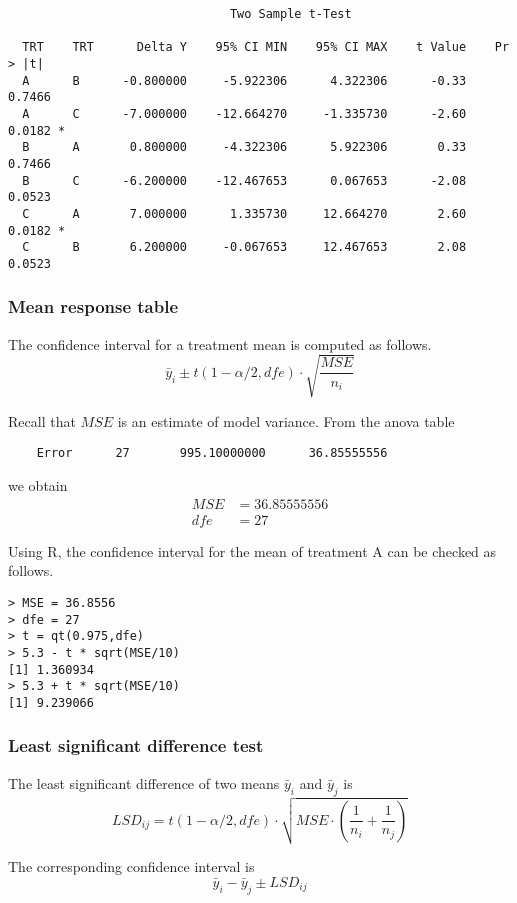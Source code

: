 \documentclass[12pt]{article}
\begin{document}
{\begin{verbatim}
                               Two Sample t-Test

  TRT    TRT      Delta Y    95% CI MIN    95% CI MAX    t Value    Pr > |t|  
  A      B      -0.800000     -5.922306      4.322306      -0.33      0.7466  
  A      C      -7.000000    -12.664270     -1.335730      -2.60      0.0182 *
  B      A       0.800000     -4.322306      5.922306       0.33      0.7466  
  B      C      -6.200000    -12.467653      0.067653      -2.08      0.0523  
  C      A       7.000000      1.335730     12.664270       2.60      0.0182 *
  C      B       6.200000     -0.067653     12.467653       2.08      0.0523  
\end{verbatim}}

\subsubsection*{Mean response table}

The confidence interval for a treatment mean is computed as follows.
\[
\bar y_i\pm t(1-\alpha/2,dfe)\cdot\sqrt{\frac{MSE}{n_i}}
\]

Recall that $MSE$ is an estimate of model variance.
From the anova table

{\footnotesize\begin{verbatim}
    Error      27       995.10000000      36.85555556
\end{verbatim}}

we obtain
\begin{align*}
MSE&=36.85555556\\
dfe&=27
\end{align*}

Using R, the confidence interval for the mean of treatment A can be
checked as follows.

{\footnotesize\begin{verbatim}
> MSE = 36.8556
> dfe = 27
> t = qt(0.975,dfe)
> 5.3 - t * sqrt(MSE/10)
[1] 1.360934
> 5.3 + t * sqrt(MSE/10)
[1] 9.239066
\end{verbatim}}

\subsubsection*{Least significant difference test}

The least significant difference of two means
$\bar y_i$ and $\bar y_j$ is
\[
LSD_{ij}=t(1-\alpha/2,dfe)\cdot\sqrt{MSE\cdot
\left(\frac{1}{n_i}+\frac{1}{n_j}\right)}
\]

The corresponding confidence interval is
\[
\bar y_i-\bar y_j\pm LSD_{ij}
\]
\end{document}
